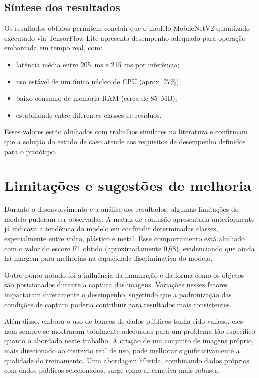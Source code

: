 \documentclass[repeatfields,xlists,xpacks,oneside]{ufrgscca}
\begin{document}
\subsection{Síntese dos resultados}

Os resultados obtidos permitem concluir que o modelo MobileNetV2 quantizado executado via TensorFlow Lite apresenta desempenho adequado para operação embarcada em tempo real, com:

\begin{itemize}
    \item latência média entre 205~ms e 215~ms por inferência;
    \item uso estável de um único núcleo de CPU (aprox. 27\%);
    \item baixo consumo de memória RAM (cerca de 85~MB);
    \item estabilidade entre diferentes classes de resíduos.
\end{itemize}

Esses valores estão alinhados com trabalhos similares na literatura e confirmam que a solução do estudo de caso atende aos requisitos de desempenho definidos para o protótipo.

\section{Limitações e sugestões de melhoria}
\label{sec:limitacoes}

Durante o desenvolvimento e a análise dos resultados, algumas limitações do modelo puderam ser observadas. A matriz de confusão apresentada anteriormente já indicava a tendência do modelo em confundir determinadas classes, especialmente entre vidro, plástico e metal. Esse comportamento está alinhado com o valor do escore F1 obtido (aproximadamente 0{,}68), evidenciando que ainda há margem para melhorias na capacidade discriminativa do modelo.

Outro ponto notado foi a influência da iluminação e da forma como os objetos são posicionados durante a captura das imagens. Variações nesses fatores impactaram diretamente o desempenho, sugerindo que a padronização das condições de captura poderia contribuir para resultados mais consistentes.

Além disso, embora o uso de bancos de dados públicos tenha sido valioso, eles nem sempre se mostraram totalmente adequados para um problema tão específico quanto o abordado neste trabalho. A criação de um conjunto de imagens próprio, mais direcionado ao contexto real de uso, pode melhorar significativamente a qualidade do treinamento. Uma abordagem híbrida, combinando dados próprios com dados públicos selecionados, surge como alternativa mais robusta.
\end{document}
